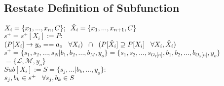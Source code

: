 \documentclass[11pt]{article}
\begin{document}
\subsection{Restate Definition of Subfunction}
\begin{center}
$
X_i = \{x_1,...,x_n,C\}; \hspace{2mm} \hat{X}_i = \{x_1,...,x_{n+1},C\}
$
\\ \vspace{2mm}
$
s^+ = s^+[X_i] := P :
$
\\ \vspace{2mm}
$
(P \lbrack X_i \rbrack \rightarrow y_{o} == a_{o} \hspace{3mm} \forall X_i) \hspace{2mm} \cap \hspace{2mm} (P[\hat{X}_i] \supseteq P[X_i] \hspace{3mm} \forall X_i,\hat{X}_i)
$
\\ \vspace{4mm}
$
s^+ = \{ s_1,s_2,...,s_N|b_1,b_2,...,b_M,y_o\} = \{ s_1,s_2,...,s_{O_T \lbrack n \rbrack }, b_1, b_2,...,b_{O_S \lbrack n \rbrack},y_o \}
$
\\ \vspace{2mm}
$
= \{ \mathcal{L},\mathcal{M},y_o\}
$
\\ \vspace{6mm}
$
Sub[X_i] := S = \{s_j,...|b_k,...,y_o\}:
$
\\ \vspace{2mm}
$
s_j,b_k \in s^+ \hspace{3mm} \forall s_j,b_k \in S
$
\end{center}
\end{document}
